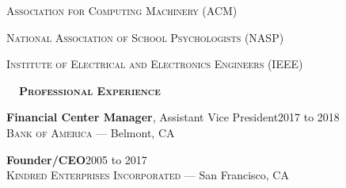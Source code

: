 \documentclass[hidelinks, 10pt]{article}
\def\contentwidth{0.9\linewidth}    %
\def\contentblockspacing{2.5mm}     %
\def\sectionspacing{8mm}            %
\def\sectiontocontentspacing{4mm}   %
\renewcommand{\section}[1]{
    {\fontsize{14}{14}\selectfont \textsc{\textbf{\ \ #1\ \ }}}\hrulefill
}
\begin{document}
{\vspace{0.5mm}

\begin{minipage}[ct]{\contentwidth}
    \textsc{Association for Computing Machinery} (ACM)
\end{minipage}

\vspace{0.5mm}

\begin{minipage}[ct]{\contentwidth}
    \textsc{National Association of School Psychologists} (NASP)
\end{minipage}

\vspace{0.5mm}

\begin{minipage}[ct]{\contentwidth}
    \textsc{Institute of Electrical and Electronics Engineers} (IEEE)
\end{minipage}

\vspace{\sectionspacing}



\section{Professional Experience}

\vspace{\sectiontocontentspacing}

\begin{minipage}[ct]{\contentwidth}
    \textbf{Financial Center Manager}, Assistant Vice President\hfill 2017 to 2018\\
    {\textsc{Bank of America} --- Belmont, CA}
\end{minipage}

\vspace{\contentblockspacing}

\begin{minipage}[ct]{\contentwidth}
    \textbf{Founder/CEO}\hfill 2005 to 2017\\
    {\textsc{Kindred Enterprises Incorporated} --- San Francisco, CA}
\end{minipage}

}
\end{document}

